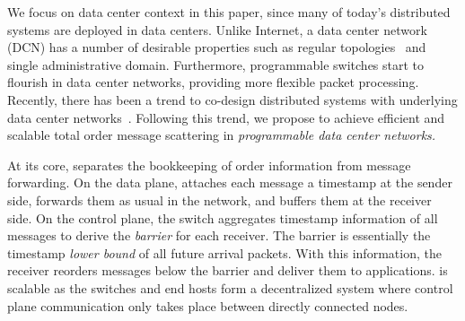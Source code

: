 We focus on data center context in this paper, since many of today's distributed systems are deployed in data centers. Unlike Internet, a data center network (DCN) has a number of desirable properties such as regular topologies~\cite{leiserson1985fat,greenberg2009vl2} and single administrative domain. Furthermore, programmable switches start to flourish in data center networks, providing more flexible packet processing. Recently, there has been a trend to co-design distributed systems with underlying data center networks~\cite{eris,netcache-sosp17,dang2016paxos}. Following this trend, we propose \sys to achieve efficient and scalable total order message scattering in \emph{programmable data center networks.}
 



At its core, \sys separates the bookkeeping of order information from message forwarding. On the data plane, \sys attaches each message a timestamp at the sender side, forwards them as usual in the network, and buffers them at the receiver side. On the control plane, the switch aggregates timestamp information of all messages to derive the \textit{barrier} for each receiver. The barrier is essentially the timestamp \textit{lower bound} of all future arrival packets. With this information, the receiver reorders messages below the barrier and deliver them to applications. \sys is scalable as the switches and end hosts form a decentralized system where control plane communication only takes place between directly connected nodes.

